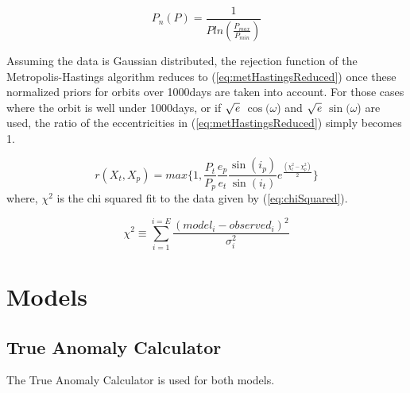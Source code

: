 \documentclass[12pt,preprint]{aastex}
\begin{document}
\begin{equation}\label{eq:pProb}
P_n(P) =  \frac{1}{P ln(\frac{P_{max}}{P_{min}})}
\end{equation}

Assuming the data is Gaussian distributed, the rejection function of the Metropolis-Hastings algorithm reduces to (\ref{eq:metHastingsReduced}) once these normalized priors for orbits over 1000days are taken into account.  For those cases where the orbit is well under 1000days, or if $\sqrt{{\it e}}$ $\cos(\omega$) and $\sqrt{{\it e}}$ $\sin(\omega$) are used, the ratio of the eccentricities in (\ref{eq:metHastingsReduced}) simply becomes 1.

\begin{equation}\label{eq:metHastingsReduced}
r(X_t,X_p) = max\bigg\{1, \frac{P_t}{P_p}\frac{e_p}{e_t}\frac{\sin(i_p)}{\sin(i_t)}e^{\frac{(\chi^2_t - \chi^2_p)}{2}} \bigg\}
\end{equation}
where, $\chi^2$ is the chi squared fit to the data given by (\ref{eq:chiSquared}).

\begin{equation}\label{eq:chiSquared}
{\chi}^{2} \equiv  \sum_{i=1}^{i=E} \frac{(model_i - observed_i)^{2}}{\sigma^{2}_i}
\end{equation}




\section{Models}\label{sec:models}

\subsection{True Anomaly Calculator}\label{sec:TAcalc}
The True Anomaly Calculator is used for both models.
\end{document}
